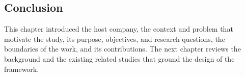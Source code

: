 \subsection{Conclusion}

This chapter introduced the host company, the context and problem that motivate the study, its purpose, objectives, and research questions, the boundaries of the work, and its contributions. The next chapter reviews the background and the existing related studies that ground the design of the framework.
